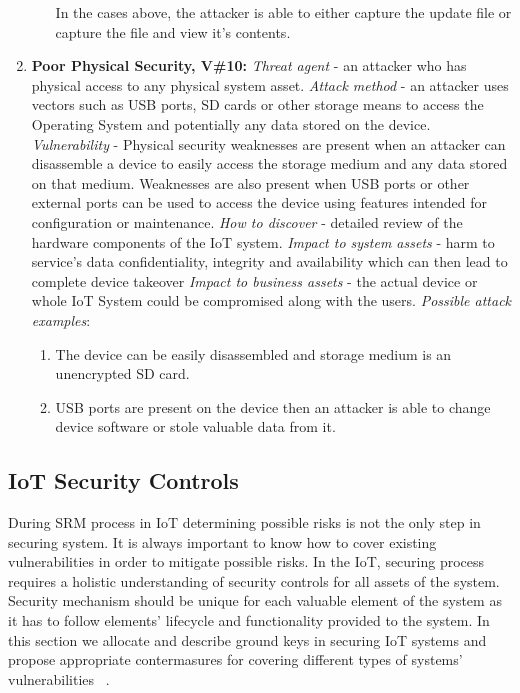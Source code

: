 \documentclass[12pt]{article}
\begin{document}
\begin{enumerate}
\begin{enumerate}[label=(\roman*)]
			In the cases above, the attacker is able to either capture the update file or capture the file and view it's contents.
		\end{enumerate}
	\item \textbf{Poor Physical Security, V\#10:}
		\newline \textit{Threat agent} - an attacker who has physical access to any physical system asset.
		\newline \textit{Attack method} - an attacker uses vectors such as USB ports, SD cards or other storage means to access the Operating System and potentially any data stored on the device.
		\newline \textit{Vulnerability} - Physical security weaknesses are present when an attacker can disassemble a device to easily access the storage medium and any data stored on that medium. Weaknesses are also present when USB ports or other external ports can be used to access the device using features intended for configuration or maintenance.
		\newline \textit{How to discover} - detailed review of the hardware components of the IoT system.
		\newline \textit{Impact to system assets} - harm to service’s data confidentiality, integrity and availability	which can then lead to complete device takeover
		\newline \textit{Impact to business assets} - the actual device or whole IoT System could be compromised along with the users.
		\newline \textit{Possible attack examples}:
		\begin{enumerate}[label=(\roman*)]
			\item The device can be easily disassembled and storage medium is an unencrypted SD card.
			\item USB ports are present on the device then an attacker is able to change device software or stole valuable data from it.
		\end{enumerate}
\end{enumerate}    
\vspace*{1ex}


\subsection{IoT Security Controls } 
During SRM process in IoT determining possible risks is not the only step in securing system. It is always important to know how to cover existing vulnerabilities in order to mitigate possible risks. In the IoT, securing process requires a holistic understanding of security controls for all assets of the system. Security mechanism should be unique for each valuable element of the system as it has to follow elements' lifecycle and functionality provided to the system. In this section we allocate and describe ground keys in securing IoT systems and propose appropriate contermasures for covering different types of systems' vulnerabilities ~\cite{SecIoT}.
\end{document}
